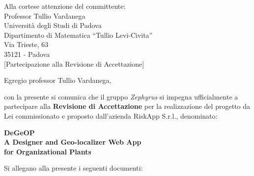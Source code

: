 \documentclass[a4paper,12pt]{letteracdp}
\author{Marco Pasqualini}
\date{26 Agosto 2017}
\begin{document}
	\begin{letter}{
			Alla cortese attenzione del committente: \\
			Professor Tullio Vardanega \\

			Università degli Studi di Padova \\
			Dipartimento di Matematica “Tullio Levi-Civita”\\
			Via Trieste, 63 \\
			35121 - Padova\\}
		[Partecipazione alla Revisione di Accettazione]

	\opening{Egregio professor Tullio Vardanega,}
	con la presente si comunica che il gruppo \textit{Zephyrus} si impegna ufficialmente a partecipare alla \textbf{Revisione di Accettazione} per la realizzazione del progetto da Lei commissionato e proposto dall'azienda RiskApp S.r.l., denominato:

	\begin{center}
        \textbf{DeGeOP \\ A Designer and Geo-localizer Web App \\for Organizational Plants}\\
	\end{center}
	\vspace{0.6cm}

	\noindent Si allegano alla presente
	 i seguenti documenti:



\end{letter}
\end{document}
